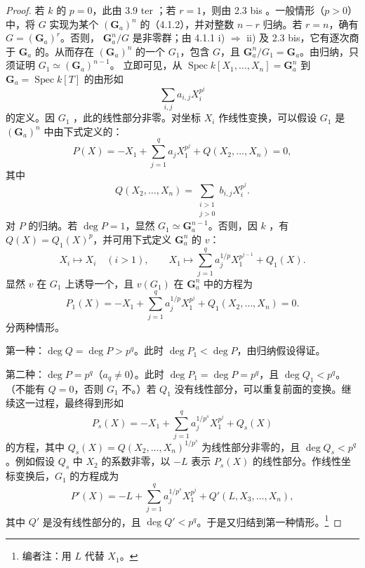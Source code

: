 \begin{proof}
若 $k$ 的 $p=0$，此由 3.9 ter ；若 $r=1$，则由 2.3 bis 。一般情形（$p>0$）中，将 $G$ 实现为某个 $(\mathbf G_a)^n$ 的（4.1.2），并对整数 $n-r$ 归纳。若 $r=n$，确有 $G=(\mathbf G_a)^r$。否则， $\mathbf G_a^n/G$ 是非零群；由 4.1.1 i) $\Rightarrow$ ii) 及 2.3 bis，它有逐次商于 $\mathbf G_a$ 的。从而存在 $(\mathbf G_a)^n$ 的一个 $G_1$，包含 $G$，且
$\mathbf G_a^n/G_1=\mathbf G_a$。由归纳，只须证明 $G_1\simeq(\mathbf G_a)^{n-1}$。
立即可见，从 $\operatorname{Spec}k[X_1,\ldots,X_n]=\mathbf G_a^n$ 到 $\mathbf G_a=\operatorname{Spec}k[T]$ 的由形如
\[\sum_{i,j}a_{i,j}X_i^{p^j}\]
的定义。因 $G_1$ ，此的线性部分非零。对坐标 $X_i$ 作线性变换，可以假设 $G_1$ 是 $(\mathbf G_a)^n$ 中由下式定义的：
\[
P(X)=-X_1+\sum_{j=1}^q a_jX_1^{p^j}+Q(X_2,\ldots,X_n)=0,
\tag{$*$}
\]
其中
\[Q(X_2,\ldots,X_n)=\sum_{\substack{i>1\\j>0}}b_{i,j}X_i^{p^j}.\]
对 $P$ 的归纳。若 $\deg P=1$，显然 $G_1\simeq\mathbf G_a^{n-1}$。否则，因 $k$ ，有 $Q(X)=Q_1(X)^p$，并可用下式定义 $\mathbf G_a^n$ 的 $v$：
\[
X_i\longmapsto X_i\quad(i>1),\qquad
X_1\longmapsto\sum_{j=1}^q a_j^{1/p}X_1^{p^{j-1}}+Q_1(X).
\]
显然 $v$ 在 $G_1$ 上诱导一个，且 $v(G_1)$ 在 $\mathbf G_a^n$ 中的方程为
\[
P_1(X)=-X_1+\sum_{j=1}^q a_j^{1/p}X_1^{p^j}+Q_1(X_2,\ldots,X_n)=0.
\tag{$*_1$}
\]
分两种情形。

第一种：$\deg Q=\deg P>p^q$。此时 $\deg P_1<\deg P$，由归纳假设得证。

第二种：$\deg P=p^q$（$a_q\ne0$）。此时 $\deg P_1=\deg P=p^q$，且 $\deg Q_1<p^q$。（不能有 $Q=0$，否则 $G_1$ 不。）若 $Q_1$ 没有线性部分，可以重复前面的变换。继续这一过程，最终得到形如
\[
P_s(X)=-X_1+\sum_{j=1}^q a_j^{1/p^s}X_1^{p^j}+Q_s(X)
\tag{$*_s$}
\]
的方程，其中 $Q_s(X)=Q(X_2,\ldots,X_n)^{1/p^s}$ 为线性部分非零的，且 $\deg Q_s<p^q$。例如假设 $Q_s$ 中 $X_2$ 的系数非零，以 $-L$ 表示 $P_s(X)$ 的线性部分。作线性坐标变换后，$G_1$ 的方程成为
\[P'(X)=-L+\sum_{j=1}^q a_j^{1/p^s}X_1^{p^j}+Q'(L,X_3,\ldots,X_n),\]
其中 $Q'$ 是没有线性部分的，且 $\deg Q'<p^q$。于是又归结到第一种情形。\footnote{编者注：用 $L$ 代替 $X_1$。}
\end{proof}
